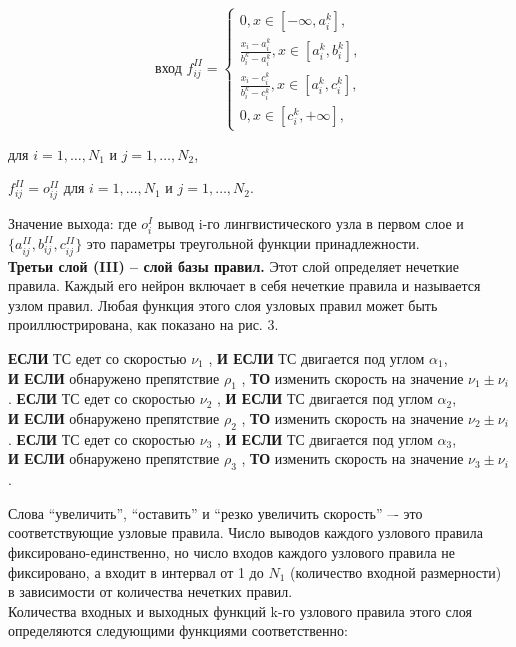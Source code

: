 \documentclass{article}
\begin{document}
  \begin{center}
    \Large
    $$\text{вход }f_{ij}^{II}=
    \begin{cases}
      0, x \in [-\infty, a_i^k],\\
      \frac{x_i - a_i^k}{b_i^k - a_i^k}, x \in [a_i^k, b_i^k],\\
      \frac{x_i - c_i^k}{b_i^k - c_i^k}, x \in [a_i^k, c_i^k],\\ 
      0, x \in [c_i^k, +\infty],
    \end{cases}$$
  \end{center}
  {
    для $i = 1, \ldots, N_1$ и $j = 1, \ldots, N_2$,
  }
  \begin{center}
    $f_{ij}^{II}=o_{ij}^{II}$ для $i=1,\ldots,N_1$ и $j=1,\ldots,N_2$.
  \end{center}
  {
  \indent\indent Значение выхода: где $o_i^I$ вывод i-го лингвистического узла в первом слое и $\{a_{ij}^{II}, b_{ij}^{II}, c_{ij}^{II}\}$
  это параметры треугольной функции принадлежности.\\
  \indent\indent \textbf{Третьи слой (III) – слой базы правил.} Этот слой определяет нечеткие правила. Каждый его нейрон включает 
  в себя нечеткие правила и называется узлом правил. Любая функция этого слоя узловых правил может быть проиллюстрирована, 
  как показано на рис. 3.\\
  }
  \begin{center}
    \textbf{ЕСЛИ} ТС едет со скоростью $\nu_1$ , \textbf{И ЕСЛИ} ТС двигается под углом $\alpha_1$,\\
    \textbf{И ЕСЛИ} обнаружено препятствие $\rho_1$ , \textbf{ТО} изменить скорость на значение $\nu_1\pm\nu_i$.
    \textbf{ЕСЛИ} ТС едет со скоростью $\nu_2$ , \textbf{И ЕСЛИ} ТС двигается под углом $\alpha_2$,\\
    \textbf{И ЕСЛИ} обнаружено препятствие $\rho_2$ , \textbf{ТО} изменить скорость на значение $\nu_2\pm\nu_i$.
    \textbf{ЕСЛИ} ТС едет со скоростью $\nu_3$ , \textbf{И ЕСЛИ} ТС двигается под углом $\alpha_3$,\\
    \textbf{И ЕСЛИ} обнаружено препятствие $\rho_3$ , \textbf{ТО} изменить скорость на значение $\nu_3\pm\nu_i$.
  \end{center}
  {
    \indent\indent Слова “увеличить”, “оставить” и “резко увеличить скорость” –- это соответствующие узловые правила. 
    Число выводов каждого узлового правила фиксировано-единственно, но число входов каждого узлового правила не фиксировано, 
    а входит в интервал от 1 до $N_1$ (количество входной размерности) в зависимости от количества нечетких правил.\\
    \indent\indent Количества входных и выходных функций k-го узлового правила этого слоя определяются следующими функциями соответственно:
  }
\end{document}
